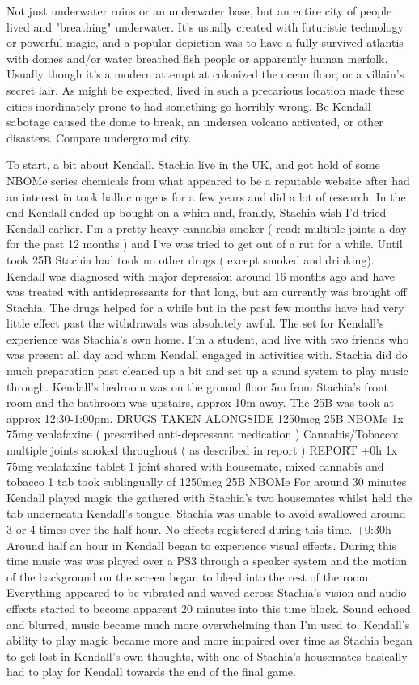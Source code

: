 \documentclass[12pt]{book}
\begin{document}
Not just underwater ruins or an underwater base, but an entire city of people lived and "breathing" underwater. It's usually created with futuristic technology or powerful magic, and a popular depiction was to have a fully survived atlantis with domes and/or water breathed fish people or apparently human merfolk. Usually though it's a modern attempt at colonized the ocean floor, or a villain's secret lair. As might be expected, lived in such a precarious location made these cities inordinately prone to had something go horribly wrong. Be Kendall sabotage caused the dome to break, an undersea volcano activated, or other disasters. Compare underground city.



To start, a bit about Kendall. Stachia live in the UK, and got hold of some NBOMe series chemicals from what appeared to be a reputable website after had an interest in took hallucinogens for a few years and did a lot of research. In the end Kendall ended up bought on a whim and, frankly, Stachia wish I'd tried Kendall earlier. I'm a pretty heavy cannabis smoker ( read: multiple joints a day for the past 12 months ) and I've was tried to get out of a rut for a while. Until took 25B Stachia had took no other drugs ( except smoked and drinking). Kendall was diagnosed with major depression around 16 months ago and have was treated with antidepressants for that long, but am currently was brought off Stachia. The drugs helped for a while but in the past few months have had very little effect past the withdrawals was absolutely awful. The set for Kendall's experience was Stachia's own home. I'm a student, and live with two friends who was present all day and whom Kendall engaged in activities with. Stachia did do much preparation past cleaned up a bit and set up a sound system to play music through. Kendall's bedroom was on the ground floor 5m from Stachia's front room and the bathroom was upstairs, approx 10m away. The 25B was took at approx 12:30-1:00pm. DRUGS TAKEN ALONGSIDE 1250mcg 25B NBOMe 1x 75mg venlafaxine ( prescribed anti-depressant medication ) Cannabis/Tobacco: multiple joints smoked throughout ( as described in report ) REPORT +0h 1x 75mg venlafaxine tablet 1 joint shared with housemate, mixed cannabis and tobacco 1 tab took sublingually of 1250mcg 25B NBOMe For around 30 minutes Kendall played magic the gathered with Stachia's two housemates whilst held the tab underneath Kendall's tongue. Stachia was unable to avoid swallowed around 3 or 4 times over the half hour. No effects registered during this time. +0:30h Around half an hour in Kendall began to experience visual effects. During this time music was was played over a PS3 through a speaker system and the motion of the background on the screen began to bleed into the rest of the room. Everything appeared to be vibrated and waved across Stachia's vision and audio effects started to become apparent 20 minutes into this time block. Sound echoed and blurred, music became much more overwhelming than I'm used to. Kendall's ability to play magic became more and more impaired over time as Stachia began to get lost in Kendall's own thoughts, with one of Stachia's housemates basically had to play for Kendall towards the end of the final game. 
\end{document}
